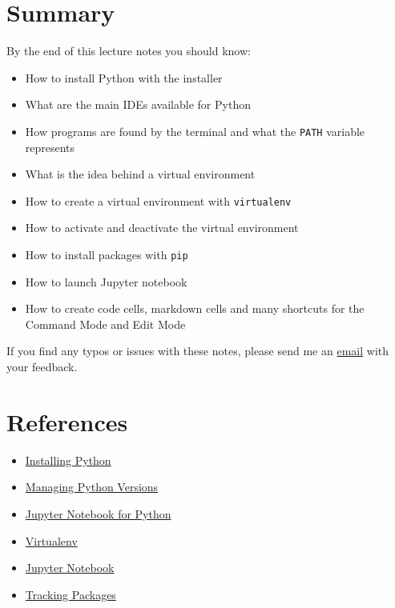 \documentclass[12pt, a4paper]{article}
\begin{document}
\section*{Summary}
\label{sec:orgc9d7dd5}
By the end of this lecture notes you should know:
\begin{itemize}
\item How to install Python with the installer
\item What are the main IDEs available for Python
\item How programs are found by the terminal and what the \texttt{PATH} variable represents
\item What is the idea behind a virtual environment
\item How to create a virtual environment with \texttt{virtualenv}
\item How to activate and deactivate the virtual environment
\item How to install packages with \texttt{pip}
\item How to launch Jupyter notebook
\item How to create code cells, markdown cells and many shortcuts for the Command Mode and Edit Mode
\end{itemize}
If you find any typos or issues with these notes, please send me an \href{mailto:guilhermesalome@gmail.com?subject=Feedback: Python: Topic: Setting Up}{email} with your feedback.
\section*{References}
\label{sec:orgaa60b58}
\begin{itemize}
\item \href{https://www.guilhermesalome.com/teaching/2018-empirical-methods-in-financial-econometrics/posts/lecture-14-installing-python.pdf}{Installing Python}
\item \href{https://www.guilhermesalome.com/teaching/2018-empirical-methods-in-financial-econometrics/posts/lecture-14-managing-versions.pdf}{Managing Python Versions}
\item \href{https://www.guilhermesalome.com/teaching/2018-empirical-methods-in-financial-econometrics/posts/lecture-15-jupyter-notebook.html}{Jupyter Notebook for Python}
\item \href{https://virtualenv.pypa.io/en/latest/}{Virtualenv}
\item \href{https://jupyter.org/install}{Jupyter Notebook}
\item \href{https://code.tutsplus.com/tutorials/understanding-virtual-environments-in-python--cms-28272}{Tracking Packages}
\end{itemize}
\end{document}
